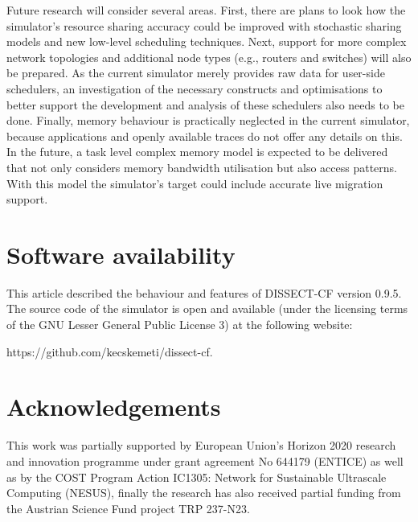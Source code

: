 \documentclass[sort, compress, 5p]{elsarticle}
\begin{document}
Future research will consider several areas. First, there are plans to look how the simulator's resource sharing accuracy could be improved with stochastic sharing models and new low-level scheduling techniques. Next, support for more complex network topologies and additional node types (e.g., routers and switches) will also be prepared. As the current simulator merely provides raw data for user-side schedulers, an investigation of the necessary constructs and optimisations to better support the development and analysis of these schedulers also needs to be done. Finally, memory behaviour is practically neglected in the current simulator, because applications and openly available traces do not offer any details on this. In the future, a task level complex memory model is expected to be delivered that not only considers memory bandwidth utilisation but also access patterns. With this model the simulator's target could include accurate live migration support.

\section*{Software availability}
This article described the behaviour and features of DISSECT-CF version 0.9.5. The source code of the simulator is open and available (under the licensing terms of the GNU Lesser General Public License 3) at the following website: 

https://github.com/kecskemeti/dissect-cf. 

\section*{Acknowledgements}

This work was partially supported by European Union's Horizon 2020 research and innovation programme under grant agreement No 644179 (ENTICE) as well as by the COST Program Action IC1305: Network for Sustainable Ultrascale Computing (NESUS), finally the research has also received partial funding from the Austrian Science Fund project TRP 237-N23.
\end{document}
